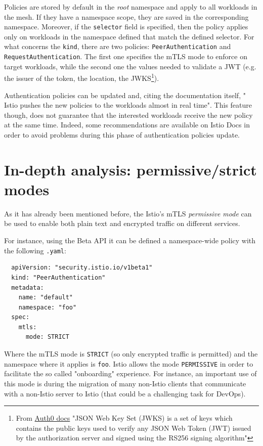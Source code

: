 Policies are stored by default in the \textit{root} namespace and apply to all workloads in the mesh. If they have a namespace scope, they are saved in the corresponding namespace. Moreover, if the \texttt{selector} field is specified, then the policy applies only on workloads in the namespace defined that match the defined selector. For what concerns the \texttt{kind}, there are two policies: \texttt{PeerAuthentication} and \texttt{RequestAuthentication}. The first one specifies the mTLS mode to enforce on target workloads, while the second one the values needed to validate a JWT (e.g. the issuer of the token, the location, the JWKS\footnote{From \href{https://auth0.com/docs/tokens/concepts/jwks}{Auth0 docs} "JSON Web Key Set (JWKS) is a set of keys which contains the public keys used to verify any JSON Web Token (JWT) issued by the authorization server and signed using the RS256 signing algorithm"}).

Authentication policies can be updated and, citing the documentation itself, " Istio pushes the new policies to the workloads almost in real time". This feature though, does not guarantee that the interested workloads receive the new policy at the same time. Indeed, some recommendations are available on Istio Docs in order to avoid problems during this phase of authentication policies update.

\section{In-depth analysis: permissive/strict modes}
As it has already been mentioned before, the Istio's mTLS \textit{permissive mode} can be used to enable both plain text and encrypted traffic on different services.

\noindent For instance, using the Beta API it can be defined a namespace-wide policy with the following \texttt{.yaml}:

\begin{lstlisting}
  apiVersion: "security.istio.io/v1beta1"
  kind: "PeerAuthentication"
  metadata:
    name: "default"
    namespace: "foo"
  spec:
    mtls:
      mode: STRICT
\end{lstlisting}

\noindent Where the mTLS mode is \texttt{STRICT} (so only encrypted traffic is permitted) and the namespace where it applies is \texttt{foo}. Istio allows the mode \texttt{PERMISSIVE} in order to facilitate the so called "onboarding" experience. For instance, an important use of this mode is during the migration of many non-Istio clients that communicate with a non-Istio server to Istio (that could be a challenging task for DevOps).

